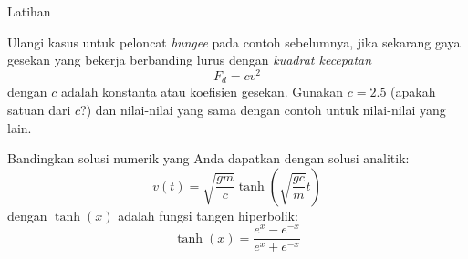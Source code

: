 \begin{frame}{Latihan}

\fontsize{9pt}{10pt}\selectfont

Ulangi kasus untuk peloncat \emph{bungee} pada contoh sebelumnya, jika
sekarang gaya gesekan yang bekerja berbanding lurus dengan \emph{kuadrat
kecepatan}
\begin{equation*}
F_{d} = c v^2
\end{equation*}
dengan $c$ adalah konstanta atau koefisien gesekan.
Gunakan $c=2.5$ (apakah satuan dari $c$?) dan nilai-nilai yang sama dengan
contoh untuk nilai-nilai yang lain.

Bandingkan solusi numerik
yang Anda dapatkan dengan solusi analitik:
\begin{equation*}
v(t) = \sqrt{\frac{g m}{c}}\tanh\left( \sqrt{\frac{g c}{m}} t \right)
\end{equation*}
dengan $\tanh(x)$ adalah fungsi tangen hiperbolik:
\begin{equation*}
\tanh(x) = \frac{e^x - e^{-x}}{e^{x} + e^{-x}}
\end{equation*}

\end{frame}




